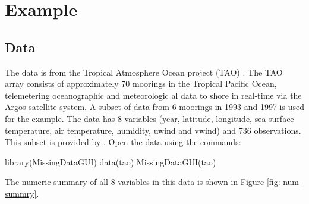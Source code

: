 \documentclass[article]{jss}
\begin{document}

\section{Example}


\subsection{Data}
The data is from the Tropical Atmosphere Ocean project (TAO) \citep{tao}. The TAO array consists of approximately 70 moorings in the Tropical Pacific Ocean, telemetering oceanographic and meteorologic al data to shore in real-time via the Argos satellite system. A subset of data from 6 moorings in 1993 and 1997 is used for the example. The data has 8 variables (year, latitude, longitude, sea surface temperature, air temperature, humidity, uwind and vwind) and 736 observations. This subset is provided by \citet{CS07}. Open the data using the commands:

\begin{Code}
library(MissingDataGUI)
data(tao)
MissingDataGUI(tao)
\end{Code}

The numeric summary of all 8 variables in this data is shown in Figure \ref{fig: num-summry}.

\end{document}
